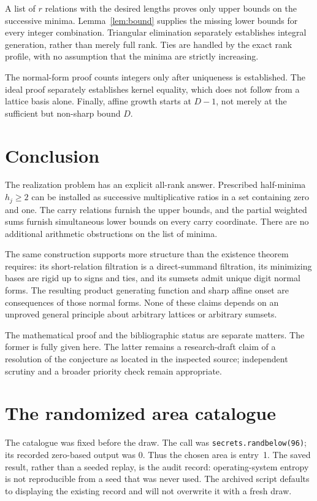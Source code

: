 \documentclass[11pt]{article}
\numberwithin{equation}{section}
\theoremstyle{definition}
\theoremstyle{remark}\newtheorem{remark}[theorem]{Remark}
\begin{document}
A list of $r$ relations with the desired lengths proves only upper bounds
on the successive minima.  Lemma~\ref{lem:bound} supplies the missing lower
bounds for every integer combination.  Triangular elimination separately
establishes integral generation, rather than merely full rank.  Ties are
handled by the exact rank profile, with no assumption that the minima are
strictly increasing.

The normal-form proof counts integers only after uniqueness is established.
The ideal proof separately establishes kernel equality, which does not
follow from a lattice basis alone.  Finally, affine growth starts at $D-1$,
not merely at the sufficient but non-sharp bound $D$.

\section{Conclusion}

The realization problem has an explicit all-rank answer.  Prescribed
half-minima $h_j\ge2$ can be installed as successive multiplicative ratios
in a set containing zero and one.  The carry relations furnish the upper
bounds, and the partial weighted sums furnish simultaneous lower bounds
on every carry coordinate.  There are no additional arithmetic obstructions
on the list of minima.

The same construction supports more structure than the existence theorem
requires: its short-relation filtration is a direct-summand filtration,
its minimizing bases are rigid up to signs and ties, and its sumsets admit
unique digit normal forms.  The resulting product generating function and
sharp affine onset are consequences of those normal forms.  None of these
claims depends on an unproved general principle about arbitrary lattices
or arbitrary sumsets.

The mathematical proof and the bibliographic status are separate matters.
The former is fully given here.  The latter remains a research-draft claim
of a resolution of the conjecture as located in the inspected source;
independent scrutiny and a broader priority check remain appropriate.

\clearpage
\appendix
\section{The randomized area catalogue}\label{app:areas}

The catalogue was fixed before the draw.  The call was
\texttt{secrets.randbelow(96)}; its recorded zero-based output was $0$.
Thus the chosen area is entry~1.  The saved result, rather than a seeded
replay, is the audit record: operating-system entropy is not reproducible
from a seed that was never used.  The archived script defaults to displaying
the existing record and will not overwrite it with a fresh draw.
\end{document}

